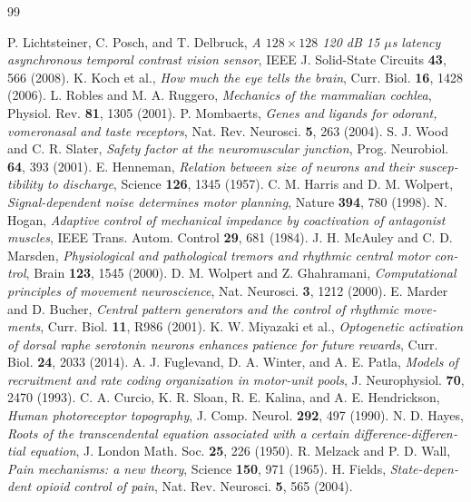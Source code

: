 \begin{thebibliography}{99}
\begin{otherlanguage}{english}
 P. Lichtsteiner, C. Posch, and T. Delbruck, \emph{A $128\times128$ 120 dB 15 $\mu$s latency asynchronous temporal contrast vision sensor}, IEEE J. Solid-State Circuits \textbf{43}, 566 (2008).
 K. Koch et al., \emph{How much the eye tells the brain}, Curr. Biol. \textbf{16}, 1428 (2006).
 L. Robles and M. A. Ruggero, \emph{Mechanics of the mammalian cochlea}, Physiol. Rev. \textbf{81}, 1305 (2001).
 P. Mombaerts, \emph{Genes and ligands for odorant, vomeronasal and taste receptors}, Nat. Rev. Neurosci. \textbf{5}, 263 (2004).
 S. J. Wood and C. R. Slater, \emph{Safety factor at the neuromuscular junction}, Prog. Neurobiol. \textbf{64}, 393 (2001).
 E. Henneman, \emph{Relation between size of neurons and their susceptibility to discharge}, Science \textbf{126}, 1345 (1957).
 C. M. Harris and D. M. Wolpert, \emph{Signal-dependent noise determines motor planning}, Nature \textbf{394}, 780 (1998).
 N. Hogan, \emph{Adaptive control of mechanical impedance by coactivation of antagonist muscles}, IEEE Trans. Autom. Control \textbf{29}, 681 (1984).
 J. H. McAuley and C. D. Marsden, \emph{Physiological and pathological tremors and rhythmic central motor control}, Brain \textbf{123}, 1545 (2000).
 D. M. Wolpert and Z. Ghahramani, \emph{Computational principles of movement neuroscience}, Nat. Neurosci. \textbf{3}, 1212 (2000).
 E. Marder and D. Bucher, \emph{Central pattern generators and the control of rhythmic movements}, Curr. Biol. \textbf{11}, R986 (2001).
 K. W. Miyazaki et al., \emph{Optogenetic activation of dorsal raphe serotonin neurons enhances patience for future rewards}, Curr. Biol. \textbf{24}, 2033 (2014).
 A. J. Fuglevand, D. A. Winter, and A. E. Patla, \emph{Models of recruitment and rate coding organization in motor-unit pools}, J. Neurophysiol. \textbf{70}, 2470 (1993).
 C. A. Curcio, K. R. Sloan, R. E. Kalina, and A. E. Hendrickson, \emph{Human photoreceptor topography}, J. Comp. Neurol. \textbf{292}, 497 (1990).
 N. D. Hayes, \emph{Roots of the transcendental equation associated with a certain difference-differential equation}, J. London Math. Soc. \textbf{25}, 226 (1950).
 R. Melzack and P. D. Wall, \emph{Pain mechanisms: a new theory}, Science \textbf{150}, 971 (1965).
 H. Fields, \emph{State-dependent opioid control of pain}, Nat. Rev. Neurosci. \textbf{5}, 565 (2004).

\end{otherlanguage}
\end{thebibliography}
